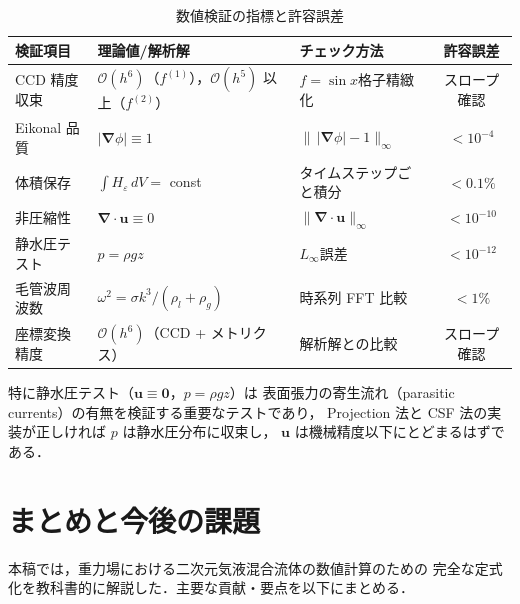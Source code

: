 \documentclass[12pt, a4paper, titlepage]{article}
\newcommand{\jp}[1]{{\normalfont\jpfont #1}}
\newcommand{\bu}{\bm{u}}
\newcommand{\bnabla}{\bm{\nabla}}
\newcommand{\He}{H_\varepsilon}
\newcommand{\Ord}[1]{\mathcal{O}(#1)}
\newcommand{\fp}[1]{f^{(1)}_{#1}}
\newcommand{\fpp}[1]{f^{(2)}_{#1}}
\begin{document}
\begin{table}[h]
\centering
\caption{\jp{数値検証の指標と許容誤差}}
\label{tab:verification}
\begin{tabular}{p{35mm}p{40mm}p{35mm}c}
\toprule
\jp{検証項目} & \jp{理論値/解析解} & \jp{チェック方法} & \jp{許容誤差}\\
\midrule
\jp{CCD 精度収束} & $\Ord{h^6}$\jp{（$\fp{}$），$\Ord{h^5}$ 以上（$\fpp{}$）} & $f=\sin x$\jp{格子精緻化} & \jp{スロープ確認}\\[3pt]
\jp{Eikonal 品質} & $|\bnabla\phi| \equiv 1$ & $\|\,|\bnabla\phi|-1\|_\infty$ & $< 10^{-4}$\\[3pt]
\jp{体積保存} & $\int\He\,dV = $ const & \jp{タイムステップごと積分} & $< 0.1\%$\\[3pt]
\jp{非圧縮性} & $\bnabla\cdot\bu \equiv 0$ & $\|\bnabla\cdot\bu\|_\infty$ & $< 10^{-10}$\\[3pt]
\jp{静水圧テスト} & $p = \rho g z$ & $L_\infty$\jp{誤差} & $< 10^{-12}$\\[3pt]
\jp{毛管波周波数} & $\omega^2 = \sigma k^3/(\rho_l+\rho_g)$ & \jp{時系列 FFT 比較} & $< 1\%$\\[3pt]
\jp{座標変換精度} & $\Ord{h^6}$\jp{（CCD + メトリクス）} & \jp{解析解との比較} & \jp{スロープ確認}\\
\bottomrule
\end{tabular}
\end{table}

\jp{特に静水圧テスト（$\bu\equiv\bm{0}$，$p=\rho g z$）は
表面張力の寄生流れ（parasitic currents）の有無を検証する重要なテストであり，
Projection 法と CSF 法の実装が正しければ $p$ は静水圧分布に収束し，
$\bu$ は機械精度以下にとどまるはずである．}


\section{\jp{まとめと今後の課題}}
\label{sec:conclusion}

\jp{本稿では，重力場における二次元気液混合流体の数値計算のための
完全な定式化を教科書的に解説した．主要な貢献・要点を以下にまとめる．}
\end{document}

